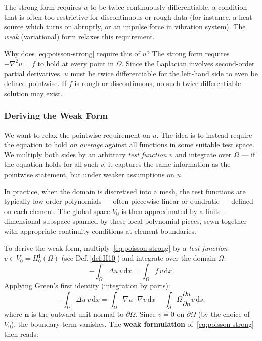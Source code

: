 \documentclass[11pt]{article}
\newcommand{\dx}{\,\mathrm{d}x}
\newcommand{\ds}{\,\mathrm{d}s}
\newcommand{\Grad}{\nabla}
\newcommand{\Lapl}{\Delta}
\newcommand{\domain}{\Omega}
\newcommand{\boundary}{\partial\Omega}
\begin{document}
The strong form requires $u$ to be twice continuously differentiable, a
condition that is often too restrictive for discontinuous or rough data (for instance, a heat source which turns on abruptly, or an impulse force in vibration system).
The \emph{weak} (variational) form relaxes this requirement.

Why does \eqref{eq:poisson-strong} require this of $u$?
The strong form requires $-\nabla^2 u = f$ to hold at every point in $\Omega$. 
Since the Laplacian involves second-order partial derivatives, $u$ must be 
twice differentiable for the left-hand side to even be defined pointwise. 
If $f$ is rough or discontinuous, no such twice-differentiable 
solution may exist.

 
\subsubsection{Deriving the Weak Form}

We want to relax the pointwise requirement on $u$. 
The idea is to instead require the equation to hold \emph{on average} against 
all functions in some suitable test space. We multiply both sides by an 
arbitrary \emph{test function} $v$ and integrate over $\domain$ --- if the 
equation holds for all such $v$, it captures the same information as the 
pointwise statement, but under weaker assumptions on $u$.

In practice, when the domain is discretised into a mesh, the test functions 
are typically low-order polynomials --- often piecewise linear or quadratic 
--- defined on each element. The global space $V_0$ is then approximated by 
a finite-dimensional subspace spanned by these local polynomial pieces, 
sewn together with appropriate continuity conditions at element boundaries.

To derive the weak form, multiply~\eqref{eq:poisson-strong} by a \emph{test function}
$v \in V_0 = H^1_0(\domain)$ (see Def.\,\vref{def:H10}) and integrate over the domain $\domain$:
\begin{equation*}
  -\int_\domain \Lapl u\, v \dx = \int_\domain f\, v \dx.
\end{equation*}
Applying Green's first identity (integration by parts):
\begin{equation*}
  -\int_\domain \Lapl u\, v \dx
    = \int_\domain \Grad u \cdot \Grad v \dx
      - \int_\boundary \frac{\partial u}{\partial n} v \ds,
\end{equation*}
where $\mathbf{n}$ is the outward unit normal to $\boundary$.
Since $v = 0$ on $\boundary$ (by the choice of $V_0$), the boundary term
vanishes.
The \textbf{weak formulation} of~\eqref{eq:poisson-strong} then reads:
\end{document}
